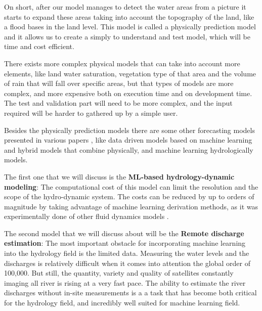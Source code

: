 \documentclass[12pt, a4paper]{report}
\begin{document}
On short, after our model manages to detect the water areas from a picture it starts to expand these areas taking into account the topography of the land, like a flood bases in the land level. This model is called a physically prediction model and it allows us to create a simply to understand and test model, which will be time and cost efficient. 
\par 

There exists more complex physical models that can take into account more elements, like land water saturation, vegetation type of that area and the volume of rain that will fall over specific areas, but that types of models are more complex, and more expensive both on execution time and on development time. The test and validation part will need to be more complex, and the input required will be harder to gathered up by a simple user. 
\par 

Besides the physically prediction models there are some other forecasting models presented in various papers \cite{Flood forecasting models}, like data driven models based on machine learning and hybrid models that combine physically, and machine learning hydrologically models.\par 

The first one that we will discuss is the \textbf{ML-based hydrology-dynamic modeling}: The computational cost of this model can limit the resolution and the scope of the hydro-dynamic system. The costs can be reduced by up to orders of magnitude by taking advantage of machine learning derivation methods, as it was experimentally done of other fluid dynamics models \cite{Yohai}.
\par 

The second model that we will discuss about will be the \textbf{Remote discharge estimation}: The most important obstacle for incorporating machine learning into the hydrology field is the limited data. Measuring the water levels and the discharges is relatively difficult when it comes into attention the global order of 100,000. But still, the quantity, variety and quality of satellites constantly imaging all river is rising at a very fast pace. The ability to estimate the river discharges without in-site measurements is a a task that has become both critical for the hydrology field, and incredibly well suited for machine learning field.
\par 
\end{document}
